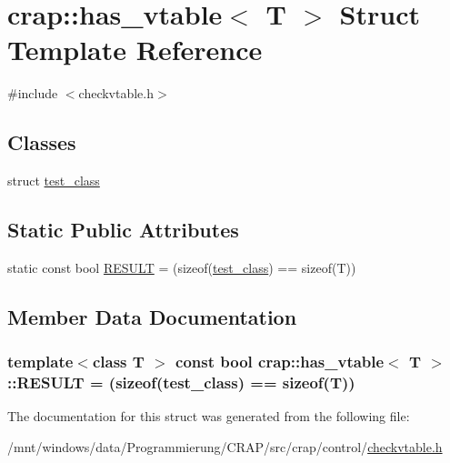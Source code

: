 \hypertarget{structcrap_1_1has__vtable}{\section{crap\-:\-:has\-\_\-vtable$<$ T $>$ Struct Template Reference}
\label{structcrap_1_1has__vtable}
}


{\ttfamily \#include $<$checkvtable.\-h$>$}

\subsection*{Classes}
\begin{DoxyCompactItemize}
\item 
struct \hyperlink{structcrap_1_1has__vtable_1_1test__class}{test\-\_\-class}
\end{DoxyCompactItemize}
\subsection*{Static Public Attributes}
\begin{DoxyCompactItemize}
\item 
static const bool \hyperlink{structcrap_1_1has__vtable_a020726388c42488ee23dc65f8e1b4b83}{R\-E\-S\-U\-L\-T} = (sizeof(\hyperlink{structcrap_1_1has__vtable_1_1test__class}{test\-\_\-class}) == sizeof(T))
\end{DoxyCompactItemize}


\subsection{Member Data Documentation}
\hypertarget{structcrap_1_1has__vtable_a020726388c42488ee23dc65f8e1b4b83}{
\subsubsection[{R\-E\-S\-U\-L\-T}]{\setlength{\rightskip}{0pt plus 5cm}template$<$class T $>$ const bool {\bf crap\-::has\-\_\-vtable}$<$ T $>$\-::R\-E\-S\-U\-L\-T = (sizeof({\bf test\-\_\-class}) == sizeof(T))\hspace{0.3cm}{\ttfamily [static]}}}\label{structcrap_1_1has__vtable_a020726388c42488ee23dc65f8e1b4b83}


The documentation for this struct was generated from the following file\-:\begin{DoxyCompactItemize}
\item 
/mnt/windows/data/\-Programmierung/\-C\-R\-A\-P/src/crap/control/\hyperlink{checkvtable_8h}{checkvtable.\-h}\end{DoxyCompactItemize}
